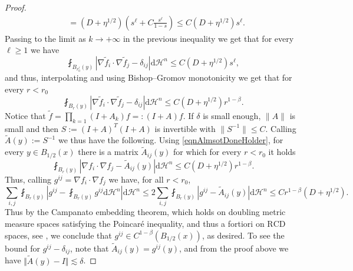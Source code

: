 \documentclass[12pt,a4paper,reqno]{amsart}
\renewcommand{\leq}{\leqslant}
\renewcommand{\geq}{\geqslant}
\renewcommand{\d}{\ensuremath{\mathrm d}}
\renewcommand{\tilde}{\widetilde}
\begin{document}
\begin{proof}
\[\begin{aligned}
        &= (D+\eta^{1/2})\left(s^\ell+C\frac{s^\ell}{1-s}\right)\leq C(D+\eta^{1/2})s^\ell.
    \end{aligned}
    \]
    Passing to the limit as $k\to+\infty$ in the previous inequality we get that for every $\ell\geq 1$ we have 
    \[
    \fint_{B_{r_0^\ell}(y)} |\nabla \tilde f_i\cdot\nabla \tilde f_j-\delta_{ij}|\d\mathcal{H}^n\leq C(D+\eta^{1/2})s^\ell,
    \]
    and thus, interpolating and using Bishop--Gromov monotonicity we get that for every $r<r_0$
    \begin{equation}\label{eqnAlmsotDoneHolder}
    \fint_{B_{r}(y)} |\nabla \tilde f_i\cdot\nabla \tilde f_j-\delta_{ij}|\d\mathcal{H}^n\leq C(D+\eta^{1/2})r^{1-\beta}.
    \end{equation}
    Notice that $\tilde f = \prod_{k=1}(I+A_k) f=:(I+A)f$. If $\delta$ is small enough, $\|A\|$ is small and then $S:=(I+A)^T(I+A)$ is invertible with $\|S^{-1}\|\leq C$. Calling $\tilde A(y):=S^{-1}$ we thus have the following. Using \eqref{eqnAlmsotDoneHolder}, for every $y\in B_{1/2}(x)$ there is a matrix $\tilde A_{ij}(y)$ for which for every $r<r_0$ it holds
    \[
    \fint_{B_r(y)}|\nabla f_i\cdot \nabla f_j-\tilde A_{ij}(y)|\d\mathcal{H}^n \leq C(D+\eta^{1/2})r^{1-\beta}.
    \]
    Thus, calling $g^{ij}=\nabla f_i\cdot \nabla f_j$ we have, for all $r<r_0$,
    \[ \sum_{i,j} \fint_{B_{r}(y)} \left|g^{ij} - \fint_{B_{r}(y)} g^{ij}\d\mathcal{H}^n\right|\d\mathcal{H}^n\leq 2\sum_{i,j} \fint_{B_{r}(y)} |g^{ij} - \tilde A_{ij}(y)|\d\mathcal{H}^n \leq Cr^{1-\beta} (D+\eta^{1/2}).
    \]
    Thus by the Campanato embedding theorem, which holds on doubling metric measure spaces satisfying the Poincaré inequality, and thus a fortiori on $\mathrm{RCD}$ spaces, see \cite{CampanatoPI}, we conclude that $g^{ij}\in C^{1-\beta}(B_{1/2}(x))$, as desired. 
To see the bound for $g^{ij} - \delta_{ij}$, note that $\widetilde A_{ij}(y)=g^{ij}(y)$, and from the proof above we have $\Vert \widetilde{A}(y) - I\Vert \lesssim \delta$. 
\end{proof}
\end{document}
